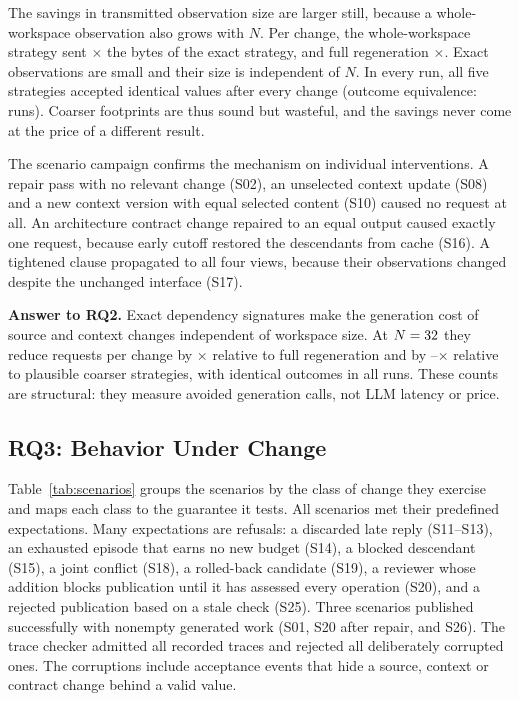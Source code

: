 \documentclass[10pt,journal,compsoc]{IEEEtran}
\theoremstyle{plain}
\theoremstyle{definition}
\begin{document}
The savings in transmitted observation size are larger still, because a whole-workspace observation also grows with $N$. Per change, the whole-workspace strategy sent \BytesRatioWorkspace$\times$ the bytes of the exact strategy, and full regeneration \BytesRatioFull$\times$. Exact observations are small and their size is independent of $N$. In every run, all five strategies accepted identical values after every change (outcome equivalence: \CostEquivalent{} runs). Coarser footprints are thus sound but wasteful, and the savings never come at the price of a different result.




The scenario campaign confirms the mechanism on individual interventions. A repair pass with no relevant change (S02), an unselected context update (S08) and a new context version with equal selected content (S10) caused no request at all. An architecture contract change repaired to an equal output caused exactly one request, because early cutoff restored the descendants from cache (S16). A tightened clause propagated to all four views, because their observations changed despite the unchanged interface (S17).

\textbf{Answer to RQ2.} Exact dependency signatures make the generation cost of source and context changes independent of workspace size. At $N=32$ they reduce requests per change by \RatioFull$\times$ relative to full regeneration and by \RatioCutoff--\RatioWorkspace$\times$ relative to plausible coarser strategies, with identical outcomes in all runs. These counts are structural: they measure avoided generation calls, not LLM latency or price.

\subsection{RQ3: Behavior Under Change}\label{sec:rq3}
Table~\ref{tab:scenarios} groups the \Scenarios{} scenarios by the class of change they exercise and maps each class to the guarantee it tests. All \ScenarioPasses{} scenarios met their predefined expectations. Many expectations are refusals: a discarded late reply (S11--S13), an exhausted episode that earns no new budget (S14), a blocked descendant (S15), a joint conflict (S18), a rolled-back candidate (S19), a reviewer whose addition blocks publication until it has assessed every operation (S20), and a rejected publication based on a stale check (S25). Three scenarios published successfully with nonempty generated work (S01, S20 after repair, and S26). The trace checker admitted all \Scenarios{} recorded traces and rejected all \Corruptions{} deliberately corrupted ones. The corruptions include acceptance events that hide a source, context or contract change behind a valid value.
\end{document}
